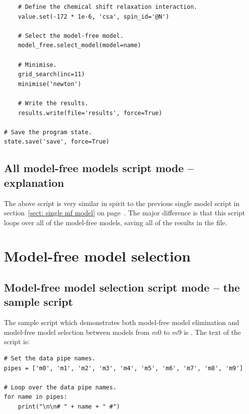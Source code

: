 \begin{htmlonly}
\begin{htmlonly}
\begin{lstlisting}
    # Define the chemical shift relaxation interaction.
    value.set(-172 * 1e-6, 'csa', spin_id='@N')
    
    # Select the model-free model.
    model_free.select_model(model=name)
    
    # Minimise.
    grid_search(inc=11)
    minimise('newton')
    
    # Write the results.
    results.write(file='results', force=True)

# Save the program state.
state.save('save', force=True)
\end{lstlisting}



\subsection{All model-free models script mode -- explanation}

The above script is very similar in spirit to the previous single model script in section~\ref{sect: single mf model} on page~\pageref{sect: single mf model}.
The major difference is that this script loops over all of the model-free models, saving all of the results in the  file.




\section{Model-free model selection}



\subsection{Model-free model selection script mode -- the sample script}

The sample script which demonstrates both model-free model elimination and model-free model selection between models from $m0$ to $m9$ is .
The text of the script is:

\begin{lstlisting}
# Set the data pipe names.
pipes = ['m0', 'm1', 'm2', 'm3', 'm4', 'm5', 'm6', 'm7', 'm8', 'm9']

# Loop over the data pipe names.
for name in pipes:
    print("\n\n# " + name + " #")
    

\end{lstlisting}
\end{htmlonly}
\end{htmlonly}
